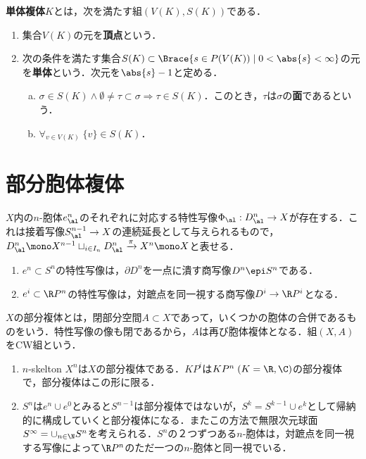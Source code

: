 \documentclass[uplatex, dvipdfmx]{jsreport}
\begin{document}
\begin{definition}
    \textbf{単体複体}$K$とは，次を満たす組$(V(K),S(K))$である．
    \begin{enumerate}
        \item 集合$V(K)$の元を\textbf{頂点}という．
        \item 次の条件を満たす集合$S(K)\subset\Brace{s\in P(V(K))\mid 0<\abs{s}<\infty}$の元を\textbf{単体}という．次元を$\abs{s}-1$と定める．
        \begin{enumerate}[(a)]
            \item $\sigma\in S(K)\land\emptyset\ne\tau\subset\sigma\Rightarrow\tau\in S(K)$．このとき，$\tau$は$\sigma$の\textbf{面}であるという．
            \item $\forall_{v\in V(K)}\;\{v\}\in S(K)$．
        \end{enumerate}
    \end{enumerate}
\end{definition}

\section{部分胞体複体}

\begin{definition}
    $X$内の$n$-胞体$e^n_\al$のそれぞれに対応する特性写像$\Phi_\al:D^n_\al\to X$が存在する．これは接着写像$S^{n-1}_\al\to X$の連続延長として与えられるもので，$D^n_\al\mono X^{n-1}\sqcup_{i\in I_n}D^n_\al\xrightarrow{\pi}X^n\mono X$と表せる．
\end{definition}
\begin{example}\mbox{}
    \begin{enumerate}
        \item $e^n\subset S^n$の特性写像は，$\partial D^n$を一点に潰す商写像$D^n\epi S^n$である．
        \item $e^i\subset\R P^n$の特性写像は，対蹠点を同一視する商写像$D^i\to\R P^i$となる．
    \end{enumerate}
\end{example}

\begin{definition}
    $X$の部分複体とは，閉部分空間$A\subset X$であって，いくつかの胞体の合併であるものをいう．特性写像の像も閉であるから，$A$は再び胞体複体となる．組$(X,A)$をCW組という．
\end{definition}
\begin{example}\mbox{}
    \begin{enumerate}
        \item $n$-skelton $X^n$は$X$の部分複体である．$KP^i$は$KP^n\;(K=\R,\C)$の部分複体で，部分複体はこの形に限る．
        \item $S^n$は$e^n\cup e^0$とみると$S^{n-1}$は部分複体ではないが，$S^k=S^{k-1}\cup e^k$として帰納的に構成していくと部分複体になる．またこの方法で無限次元球面$S^\infty=\cup_{n\in\N}S^n$を考えられる．$S^n$の２つずつある$n$-胞体は，対蹠点を同一視する写像によって$\R P^n$のただ一つの$n$-胞体と同一視でいる．
    \end{enumerate}
\end{example}
\end{document}
